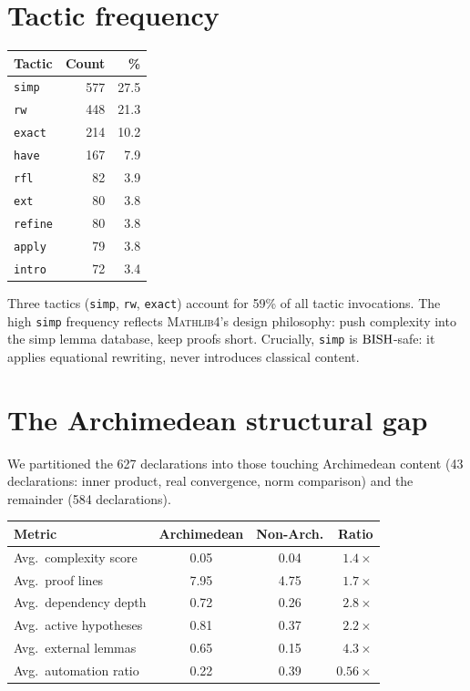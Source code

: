 \documentclass[11pt,a4paper]{article}
\theoremstyle{plain}
\theoremstyle{definition}
\newcommand{\BISH}{\textup{BISH}}
\newcommand{\Mathlib}{\textsc{Mathlib4}}
\begin{document}
\section{Tactic frequency}\label{sec:tactic-freq}

\begin{center}
\small
\begin{tabular}{lrr}
\toprule
\textbf{Tactic} & \textbf{Count} & \textbf{\%} \\
\midrule
\texttt{simp}     & 577 & 27.5 \\
\texttt{rw}       & 448 & 21.3 \\
\texttt{exact}    & 214 & 10.2 \\
\texttt{have}     & 167 &  7.9 \\
\texttt{rfl}      &  82 &  3.9 \\
\texttt{ext}      &  80 &  3.8 \\
\texttt{refine}   &  80 &  3.8 \\
\texttt{apply}    &  79 &  3.8 \\
\texttt{intro}    &  72 &  3.4 \\
\bottomrule
\end{tabular}
\end{center}

Three tactics (\texttt{simp}, \texttt{rw}, \texttt{exact}) account for
59\% of all tactic invocations.  The high \texttt{simp} frequency
reflects \Mathlib's design philosophy: push complexity into the simp
lemma database, keep proofs short.  Crucially, \texttt{simp} is
$\BISH$-safe: it applies equational rewriting, never introduces
classical content.

\section{The Archimedean structural gap}\label{sec:arch-gap}

We partitioned the 627 declarations into those touching Archimedean
content (43 declarations: inner product, real convergence, norm
comparison) and the remainder (584 declarations).

\begin{center}
\begin{tabular}{lccr}
\toprule
\textbf{Metric} & \textbf{Archimedean} & \textbf{Non-Arch.} & \textbf{Ratio} \\
\midrule
Avg.\ complexity score  & 0.05  & 0.04  & $1.4\times$ \\
Avg.\ proof lines       & 7.95  & 4.75  & $1.7\times$ \\
Avg.\ dependency depth  & 0.72  & 0.26  & $2.8\times$ \\
Avg.\ active hypotheses & 0.81  & 0.37  & $2.2\times$ \\
Avg.\ external lemmas   & 0.65  & 0.15  & $4.3\times$ \\
Avg.\ automation ratio  & 0.22  & 0.39  & $0.56\times$ \\
\bottomrule
\end{tabular}
\end{center}
\end{document}
